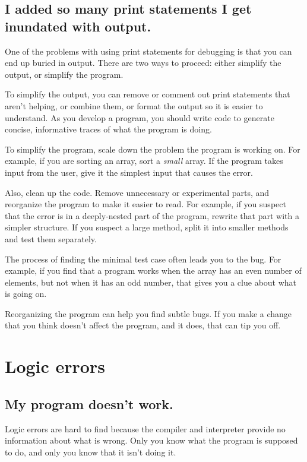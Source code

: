 \documentclass[12pt]{book}
\theoremstyle{exercise}
\begin{document}
\subsection*{I added so many print statements I get inundated with output.}


One of the problems with using print statements for debugging is that you can end up buried in output.
There are two ways to proceed: either simplify the output, or simplify the program.

To simplify the output, you can remove or comment out print statements that aren't helping, or combine them, or format the output so it is easier to understand.
As you develop a program, you should write code to generate concise, informative traces of what the program is doing.

To simplify the program, scale down the problem the program is working on.
For example, if you are sorting an array, sort a {\em small} array.
If the program takes input from the user, give it the simplest input that causes the error.

Also, clean up the code.
Remove unnecessary or experimental parts, and reorganize the program to make it easier to read.
For example, if you suspect that the error is in a deeply-nested part of the program, rewrite that part with a simpler structure.
If you suspect a large method, split it into smaller methods and test them separately.

The process of finding the minimal test case often leads you to the bug.
For example, if you find that a program works when the array has an even number of elements, but not when it has an odd number, that gives you a clue about what is going on.

Reorganizing the program can help you find subtle bugs.
If you make a change that you think doesn't affect the program, and it does, that can tip you off.


\section{Logic errors}

\subsection*{My program doesn't work.}

Logic errors are hard to find because the compiler and interpreter provide no information about what is wrong.
Only you know what the program is supposed to do, and only you know that it isn't doing it.
\end{document}
